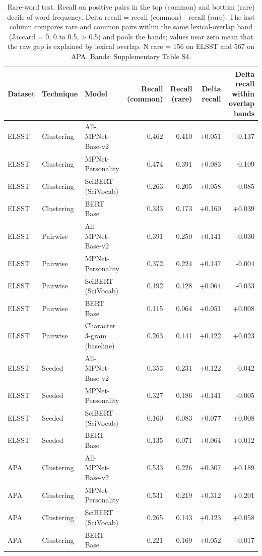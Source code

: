 \begin{table}[ht]
\centering
\small
\caption{Rare-word test. Recall on positive pairs in the top (common) and bottom (rare) decile of word frequency. Delta recall = recall (common) - recall (rare). The last column compares rare and common pairs within the same lexical-overlap band (Jaccard = 0, 0 to 0.5, > 0.5) and pools the bands; values near zero mean that the raw gap is explained by lexical overlap. N rare = 156 on ELSST and 567 on APA. Bands: Supplementary Table S4.}
\label{tab:table5_rare_word}
\begin{tabular}{lllrrrr}
\toprule
Dataset & Technique & Model & Recall (common) & Recall (rare) & Delta recall & Delta recall within overlap bands \\
\midrule
ELSST & Clustering & All-MPNet-Base-v2 & 0.462 & 0.410 & +0.051 & -0.137 \\
ELSST & Clustering & MPNet-Personality & 0.474 & 0.391 & +0.083 & -0.109 \\
ELSST & Clustering & SciBERT (SciVocab) & 0.263 & 0.205 & +0.058 & -0.085 \\
ELSST & Clustering & BERT Base & 0.333 & 0.173 & +0.160 & +0.039 \\
ELSST & Pairwise & All-MPNet-Base-v2 & 0.391 & 0.250 & +0.141 & -0.030 \\
ELSST & Pairwise & MPNet-Personality & 0.372 & 0.224 & +0.147 & -0.004 \\
ELSST & Pairwise & SciBERT (SciVocab) & 0.192 & 0.128 & +0.064 & -0.033 \\
ELSST & Pairwise & BERT Base & 0.115 & 0.064 & +0.051 & +0.008 \\
ELSST & Pairwise & Character 3-gram (baseline) & 0.263 & 0.141 & +0.122 & +0.023 \\
ELSST & Seeded & All-MPNet-Base-v2 & 0.353 & 0.231 & +0.122 & -0.042 \\
ELSST & Seeded & MPNet-Personality & 0.327 & 0.186 & +0.141 & -0.005 \\
ELSST & Seeded & SciBERT (SciVocab) & 0.160 & 0.083 & +0.077 & +0.008 \\
ELSST & Seeded & BERT Base & 0.135 & 0.071 & +0.064 & +0.012 \\
APA & Clustering & All-MPNet-Base-v2 & 0.533 & 0.226 & +0.307 & +0.189 \\
APA & Clustering & MPNet-Personality & 0.531 & 0.219 & +0.312 & +0.201 \\
APA & Clustering & SciBERT (SciVocab) & 0.265 & 0.143 & +0.123 & +0.058 \\
APA & Clustering & BERT Base & 0.221 & 0.169 & +0.052 & -0.017 \\

\end{tabular}
\end{table}
